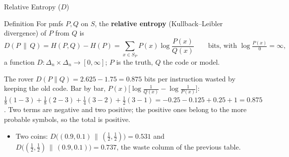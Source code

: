 \begin{frame}{Relative Entropy ($D$)}
  \small
  \begin{block}{Definition}
    For pmfs $P,Q$ on $S$, the \textbf{relative entropy} (Kullback--Leibler divergence) of $P$ from $Q$ is
    \[
      D(P\,\|\,Q)=H(P,Q)-H(P)=\sum_{x\in S_P}P(x)\log\frac{P(x)}{Q(x)}\qquad\text{bits, with }\log\tfrac{P(x)}0=\infty,
    \]
    a function $D\colon\Delta_n\times\Delta_n\to[0,\infty]$; $P$ is the truth, $Q$ the code or model.
  \end{block}
  \begin{exampleblock}{The rover}
    $D(P\|Q)=2.625-1.75=0.875$ bits per instruction wasted by keeping the old code. Bar by bar, $P(x)\big[\log\frac1{Q(x)}-\log\frac1{P(x)}\big]$:
    $\tfrac18(1-3)+\tfrac18(2-3)+\tfrac14(3-2)+\tfrac12(3-1)=-0.25-0.125+0.25+1=0.875$.
    Two terms are negative and two positive; the positive ones belong to the more probable symbols, so the total is positive.
  \end{exampleblock}
  \begin{itemize}
    \item Two coins: $D\big((0.9,0.1)\,\|\,(\tfrac12,\tfrac12)\big)=0.531$ and $D\big((\tfrac12,\tfrac12)\,\|\,(0.9,0.1)\big)=0.737$, the waste column of the previous table.
  \end{itemize}
\end{frame}

